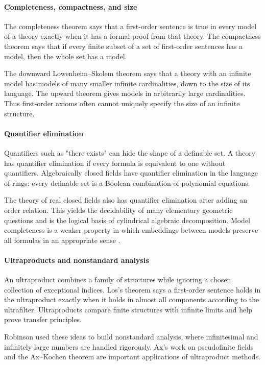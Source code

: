 \paragraph{Completeness, compactness, and size}
The completeness theorem says that a first-order sentence is true in every model of a theory exactly when it has a formal proof from that theory. The compactness theorem says that if every finite subset of a set of first-order sentences has a model, then the whole set has a model.

The downward Lowenheim--Skolem theorem says that a theory with an infinite model has models of many smaller infinite cardinalities, down to the size of its language. The upward theorem gives models in arbitrarily large cardinalities. Thus first-order axioms often cannot uniquely specify the size of an infinite structure.

\paragraph{Quantifier elimination}
Quantifiers such as "there exists" can hide the shape of a definable set. A theory has quantifier elimination if every formula is equivalent to one without quantifiers. Algebraically closed fields have quantifier elimination in the language of rings: every definable set is a Boolean combination of polynomial equations.

The theory of real closed fields also has quantifier elimination after adding an order relation. This yields the decidability of many elementary geometric questions and is the logical basis of cylindrical algebraic decomposition. Model completeness is a weaker property in which embeddings between models preserve all formulas in an appropriate sense \cite{model_theory_ref2}.

\paragraph{Ultraproducts and nonstandard analysis}
An ultraproduct combines a family of structures while ignoring a chosen collection of exceptional indices. Los's theorem says a first-order sentence holds in the ultraproduct exactly when it holds in almost all components according to the ultrafilter. Ultraproducts compare finite structures with infinite limits and help prove transfer principles.

Robinson used these ideas to build nonstandard analysis, where infinitesimal and infinitely large numbers are handled rigorously. Ax's work on pseudofinite fields and the Ax--Kochen theorem are important applications of ultraproduct methods.

